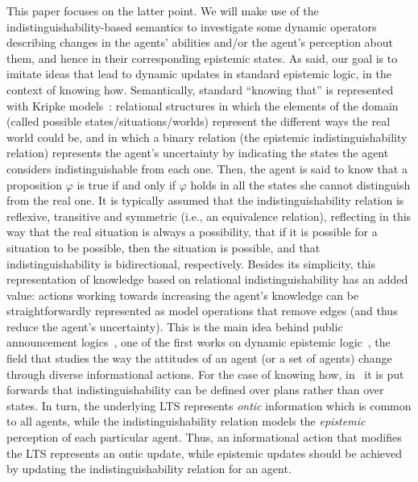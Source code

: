 

This paper focuses on the latter point. We will make use of the in\-dis\-tin\-guisha\-bil\-i\-ty-based semantics to investigate some dynamic operators describing changes in the agents' abilities and/or the agent's perception about them, and hence in their corresponding epistemic states. As said, our goal is to imitate ideas that lead to dynamic updates in standard epistemic logic, in the context of knowing how.
Semantically, standard ``knowing that'' is represented with Kripke models~\cite{mlbook,HML}: relational structures in which the elements of the domain (called possible states/situations/worlds) represent the different ways the real world could be, and in which a binary relation (the epistemic indistinguishability relation) represents the agent's uncertainty by indicating the states the agent considers indistinguishable from each one. Then, the agent is said to know that a proposition $\varphi$ is true if and only if $\varphi$ holds in all the states she cannot distinguish from the real one. It is typically assumed that the indistinguishability relation is reflexive, transitive and symmetric (i.e., an equivalence relation), reflecting in this way that the real situation is always a possibility, that if it is possible for a situation to be possible, then the situation is possible, and that indistinguishability is bidirectional, respectively. Besides its simplicity, this representation of knowledge based on relational indistinguishability has an added value: actions working towards increasing the agent's knowledge can be straightforwardly represented as model operations that remove edges (and thus reduce the agent's uncertainty). This is the main idea behind public announcement logics~\cite{Plaza89:lopc}, one of the first works on dynamic epistemic logic~\cite{DELbook}, the field that studies the way the attitudes of an agent (or a set of agents) change through diverse informational actions. For the case of knowing how, in~\cite{AFSVQ21,AFSVQ23report} it is put forwards that indistinguishability can be defined over plans rather than over states. In turn, the underlying LTS represents \emph{ontic} information which is common to all agents, while the indistinguishability relation models the \emph{epistemic} perception of each particular agent. Thus, an informational action that modifies the LTS represents an ontic update, while epistemic updates should be achieved by updating the indistinguishability relation for an agent. 
